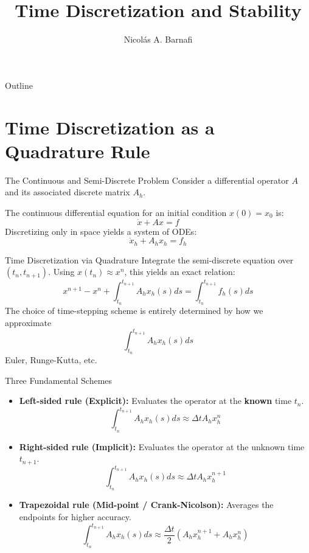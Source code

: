 \documentclass[aspectratio=169]{beamer}
\title[Finite Differences: Time Discretization]{Time Discretization and Stability}
\author{Nicol\'as A. Barnafi}
\date{}
\begin{document}
\begin{frame}
    \titlepage
\end{frame}

\begin{frame}{Outline}
    \tableofcontents
\end{frame}

\section{Time Discretization as a Quadrature Rule}

\begin{frame}{The Continuous and Semi-Discrete Problem}
    Consider a differential operator $A$ and its associated discrete matrix $A_h$.
    
    The continuous differential equation for an initial condition $x(0) = x_0$ is:
    \[
        \dot{x} + Ax = f
    \]
    Discretizing only in space yields a system of ODEs:
    \[
        \dot{x}_h + A_h x_h = f_h
    \]
\end{frame}

\begin{frame}{Time Discretization via Quadrature}
    Integrate the semi-discrete equation over  $(t_n, t_{n+1})$.  Using $x(t_n) \approx x^n$, this yields an exact relation:
    \[
        x^{n+1} - x^n + \int_{t_n}^{t_{n+1}} A_h x_h(s) ds = \int_{t_n}^{t_{n+1}} f_h(s) ds
    \]
    The choice of time-stepping scheme is entirely determined by how we approximate 
    $$\int_{t_n}^{t_{n+1}} A_h x_h(s) ds$$ 
    Euler, Runge-Kutta, etc.
\end{frame}

\begin{frame}{Three Fundamental Schemes}
    \begin{itemize}
        \item \textbf{Left-sided rule (Explicit):} Evaluates the operator at the \textbf{known} time $t_n$.
        \[
            \int_{t_n}^{t_{n+1}} A_h x_h(s) ds \approx \Delta t A_h x_h^n
        \]
        \item \textbf{Right-sided rule (Implicit):} Evaluates the operator at the \alert{unknown} time $t_{n+1}$.
        \[
            \int_{t_n}^{t_{n+1}} A_h x_h(s) ds \approx \Delta t A_h x_h^{n+1}
        \]
        \item \textbf{Trapezoidal rule (Mid-point / Crank-Nicolson):} Averages the endpoints for higher accuracy.
        \[
            \int_{t_n}^{t_{n+1}} A_h x_h(s) ds \approx \frac{\Delta t}{2} (A_h x_h^{n+1} + A_h x_h^n)
        \]
    \end{itemize}
\end{frame}
\end{document}

